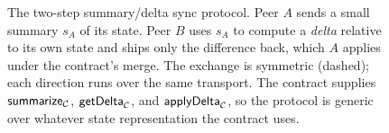 \begin{figure}[t]
\caption{The two-step summary/delta sync protocol. Peer $A$ sends a
small summary $s_A$ of its state. Peer $B$ uses $s_A$ to compute a
\emph{delta} relative to its own state and ships only the difference
back, which $A$ applies under the contract's merge. The exchange is
symmetric (dashed); each direction runs over the same transport. The
contract supplies $\mathsf{summarize}_{\mathcal{C}}$, $\mathsf{getDelta}_{\mathcal{C}}$, and
$\mathsf{applyDelta}_{\mathcal{C}}$, so the protocol is generic over whatever
state representation the contract uses.}
\label{fig:summary-delta}
\end{figure}
